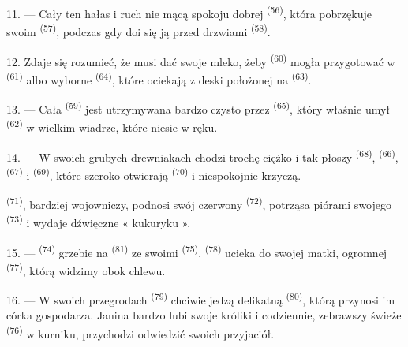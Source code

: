 11. --- Cały ten hałas i ruch nie mącą spokoju dobrej 
\textsuperscript{(56)}, która pobrzękuje swoim  \textsuperscript{(57)},
podczas gdy doi się ją przed drzwiami  \textsuperscript{(58)}.

12. Zdaje się rozumieć, że musi dać swoje mleko, żeby 
\textsuperscript{(60)} mogła przygotować  w 
\textsuperscript{(61)} albo wyborne  \textsuperscript{(64)}, które ociekają
z deski położonej na  \textsuperscript{(63)}.

13. --- Cała  \textsuperscript{(59)} jest utrzymywana bardzo czysto
przez  \textsuperscript{(65)}, który właśnie umył  \textsuperscript{(62)} w wielkim wiadrze, które niesie w ręku.

\VUsaut{3.0mm}
\VUsaut{3.0mm}

14. --- W swoich grubych drewniakach chodzi trochę ciężko i tak płoszy 
\textsuperscript{(68)},  \textsuperscript{(66)}, 
\textsuperscript{(67)} i  \textsuperscript{(69)}, które szeroko otwierają
 \textsuperscript{(70)} i niespokojnie krzyczą.

 \textsuperscript{(71)}, bardziej wojowniczy, podnosi swój czerwony
 \textsuperscript{(72)}, potrząsa piórami swojego 
\textsuperscript{(73)} i wydaje dźwięczne « kukuryku ».

15. ---  \textsuperscript{(74)} grzebie na 
\textsuperscript{(81)} ze swoimi  \textsuperscript{(75)}.
 \textsuperscript{(78)} ucieka do swojej matki, ogromnej
 \textsuperscript{(77)}, którą widzimy obok chlewu.

16. --- W swoich przegrodach  \textsuperscript{(79)} chciwie jedzą
delikatną  \textsuperscript{(80)}, którą przynosi im córka gospodarza.
Janina bardzo lubi swoje króliki i codziennie, zebrawszy świeże 
\textsuperscript{(76)} w kurniku, przychodzi odwiedzić swoich przyjaciół.
\VUsaut{6.0mm}
\VUfilet{22mm}
